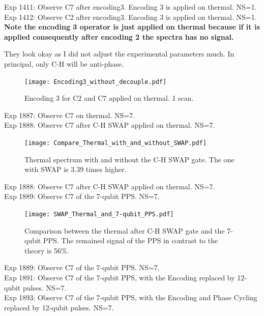 \clearpage
Exp 1411: Observe C7 after encoding3. Encoding 3 is applied on thermal. NS=1.\\
Exp 1412: Observe C2 after encoding3. Encoding 3 is applied on thermal. NS=1.\\
\textbf{Note the encoding 3 operator is just applied on thermal because if it is applied consequently after encoding 2 the spectra has no signal.}

They look okay as I did not adjust the experimental parameters much. In principal, only C-H will be anti-phase.

\begin{figure}[htb]
\begin{center}
\texttt{[image: Encoding3\_without\_decouple.pdf]}
\end{center}
\setlength{\abovecaptionskip}{-0.35cm}
\caption{\footnotesize{Encoding 3 for C2 and C7 applied on thermal. 1 scan.}}\label{1411and1412}
\end{figure}

\clearpage
Exp 1887: Observe C7 on thermal. NS=7.\\
Exp 1888: Observe C7 after C-H SWAP applied on thermal. NS=7.\\

\begin{figure}[htb]
\begin{center}
\texttt{[image: Compare\_Thermal\_with\_and\_without\_SWAP.pdf]}
\end{center}
\setlength{\abovecaptionskip}{-0.35cm}
\caption{\footnotesize{Thermal spectrum with and without the C-H SWAP gate. The one with SWAP is 3.39 times higher.}}\label{1887and1888}
\end{figure}

\clearpage
Exp 1888: Observe C7 after C-H SWAP applied on thermal. NS=7.\\
Exp 1889: Observe C7 of the 7-qubit PPS. NS=7.\\

\begin{figure}[htb]
\begin{center}
\texttt{[image: SWAP\_Thermal\_and\_7-qubit\_PPS.pdf]}
\end{center}
\setlength{\abovecaptionskip}{-0.35cm}
\caption{\footnotesize{Comparison between the thermal after C-H SWAP gate and the 7-qubit PPS. The remained signal of the PPS in contrast to the theory is 56\%.}}\label{1888and1889}
\end{figure}

\clearpage
Exp 1889: Observe C7 of the 7-qubit PPS. NS=7.\\
Exp 1891: Observe C7 of the 7-qubit PPS, with the Encoding replaced by 12-qubit pulses. NS=7.\\
Exp 1893: Observe C7 of the 7-qubit PPS, with the Encoding and Phase Cycling replaced by 12-qubit pulses. NS=7.\\


